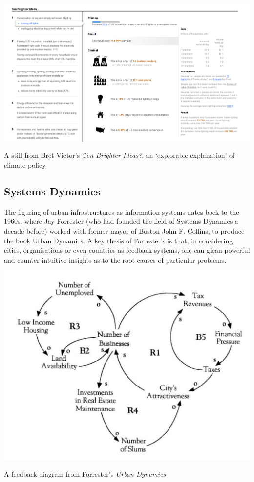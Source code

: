 \documentclass[nofonts,nols,justified,nobib]{tufte-book}
\begin{document}
\begin{marginfigure}
\includegraphics[width=\textwidth]{img/1/ten-brighter-ideas.png}
\caption{A still from Bret Victor's \emph{Ten Brighter Ideas?}, an `explorable explanation' of climate policy \cite{victor_ten_2010}  \label{b}}
\end{marginfigure}

\subsection*{Systems Dynamics}


The figuring of urban infrastructures as information systems dates back to the 1960s, where Jay Forrester (who had founded the field of Systems Dynamics a decade before) worked with former mayor of Boston John F. Collins, to produce the book Urban Dynamics. A key thesis of Forrester's is that, in considering cities, organisations or even countries as feedback systems, one can glean powerful and counter-intuitive insights as to the root causes of particular problems. 


\begin{marginfigure}
\includegraphics[width=\textwidth]{img/1/urban-dynamics.jpg}
\caption{A feedback diagram from Forrester's \emph{Urban Dynamics} \cite{forrester_urban_1969}  \label{b}}
\end{marginfigure}
\end{document}
